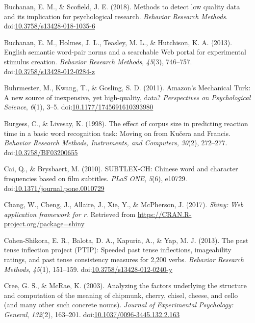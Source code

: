 \documentclass[english,man]{apa6}
\theoremstyle{definition}
\theoremstyle{definition}
\theoremstyle{definition}
\theoremstyle{remark}
\begin{document}
\hypertarget{ref-Buchanan2018}{}
Buchanan, E. M., \& Scofield, J. E. (2018). Methods to detect low
quality data and its implication for psychological research.
\emph{Behavior Research Methods}.
doi:\href{https://doi.org/10.3758/s13428-018-1035-6}{10.3758/s13428-018-1035-6}

\hypertarget{ref-Buchanan2013}{}
Buchanan, E. M., Holmes, J. L., Teasley, M. L., \& Hutchison, K. A.
(2013). English semantic word-pair norms and a searchable Web portal for
experimental stimulus creation. \emph{Behavior Research Methods},
\emph{45}(3), 746--757.
doi:\href{https://doi.org/10.3758/s13428-012-0284-z}{10.3758/s13428-012-0284-z}

\hypertarget{ref-Buhrmester2011}{}
Buhrmester, M., Kwang, T., \& Gosling, S. D. (2011). Amazon's Mechanical
Turk: A new source of inexpensive, yet high-quality, data?
\emph{Perspectives on Psychological Science}, \emph{6}(1), 3--5.
doi:\href{https://doi.org/10.1177/1745691610393980}{10.1177/1745691610393980}

\hypertarget{ref-Burgess1998}{}
Burgess, C., \& Livesay, K. (1998). The effect of corpus size in
predicting reaction time in a basic word recognition task: Moving on
from Kučera and Francis. \emph{Behavior Research Methods, Instruments,
and Computers}, \emph{30}(2), 272--277.
doi:\href{https://doi.org/10.3758/BF03200655}{10.3758/BF03200655}

\hypertarget{ref-Cai2010}{}
Cai, Q., \& Brysbaert, M. (2010). SUBTLEX-CH: Chinese word and character
frequencies based on film subtitles. \emph{PLoS ONE}, \emph{5}(6),
e10729.
doi:\href{https://doi.org/10.1371/journal.pone.0010729}{10.1371/journal.pone.0010729}

\hypertarget{ref-R-shiny}{}
Chang, W., Cheng, J., Allaire, J., Xie, Y., \& McPherson, J. (2017).
\emph{Shiny: Web application framework for r}. Retrieved from
\url{https://CRAN.R-project.org/package=shiny}

\hypertarget{ref-Cohen-Shikora2013}{}
Cohen-Shikora, E. R., Balota, D. A., Kapuria, A., \& Yap, M. J. (2013).
The past tense inflection project (PTIP): Speeded past tense
inflections, imageability ratings, and past tense consistency measures
for 2,200 verbs. \emph{Behavior Research Methods}, \emph{45}(1),
151--159.
doi:\href{https://doi.org/10.3758/s13428-012-0240-y}{10.3758/s13428-012-0240-y}

\hypertarget{ref-Cree2003}{}
Cree, G. S., \& McRae, K. (2003). Analyzing the factors underlying the
structure and computation of the meaning of chipmunk, cherry, chisel,
cheese, and cello (and many other such concrete nouns). \emph{Journal of
Experimental Psychology: General}, \emph{132}(2), 163--201.
doi:\href{https://doi.org/10.1037/0096-3445.132.2.163}{10.1037/0096-3445.132.2.163}
\end{document}
